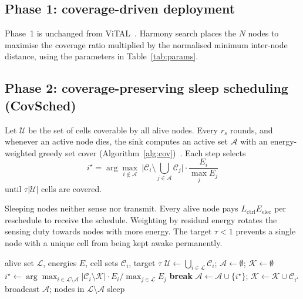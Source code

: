 \documentclass[journal]{IEEEtran}
\begin{document}
\subsection{Phase 1: coverage-driven deployment}
Phase~1 is unchanged from ViTAL~\cite{ali2025vital,alia2017hsa}. Harmony search places the $N$ nodes to maximise the coverage ratio multiplied by the normalised minimum inter-node distance, using the parameters in Table~\ref{tab:params}.

\subsection{Phase 2: coverage-preserving sleep scheduling (CovSched)}
Let $\mathcal{U}$ be the set of cells coverable by all alive nodes. Every $r_s$ rounds, and whenever an active node dies, the sink computes an active set $\mathcal{A}$ with an energy-weighted greedy set cover (Algorithm~\ref{alg:cov})~\cite{chvatal1979greedy}. Each step selects
\begin{equation}
i^\star=\arg\max_{i\notin\mathcal{A}}\ \bigl|\mathcal{C}_i\setminus \textstyle\bigcup_{j\in\mathcal{A}}\mathcal{C}_j\bigr|\cdot\frac{E_i}{\max_j E_j}
\end{equation}
until $\tau|\mathcal{U}|$ cells are covered.

Sleeping nodes neither sense nor transmit. Every alive node pays $L_{\mathrm{ctrl}}E_{\mathrm{elec}}$ per reschedule to receive the schedule. Weighting by residual energy rotates the sensing duty towards nodes with more energy. The target $\tau<1$ prevents a single node with a unique cell from being kept awake permanently.

\begin{algorithm}[t]
\caption{CovSched (run at the sink)}\label{alg:cov}
\begin{algorithmic}[1]
\Require alive set $\mathcal{L}$, energies $E$, cell sets $\mathcal{C}_i$, target $\tau$
\State $\mathcal{U}\gets\bigcup_{i\in\mathcal{L}}\mathcal{C}_i$;\; $\mathcal{A}\gets\emptyset$;\; $\mathcal{K}\gets\emptyset$
  \State $i^\star\gets\arg\max_{i\in\mathcal{L}\setminus\mathcal{A}} |\mathcal{C}_i\setminus\mathcal{K}|\cdot E_i/\max_{j\in\mathcal{L}}E_j$
   \textbf{break} \EndIf
  \State $\mathcal{A}\gets\mathcal{A}\cup\{i^\star\}$;\; $\mathcal{K}\gets\mathcal{K}\cup\mathcal{C}_{i^\star}$
\EndWhile
\State broadcast $\mathcal{A}$; nodes in $\mathcal{L}\setminus\mathcal{A}$ sleep
\end{algorithmic}
\end{algorithm}
\end{document}
